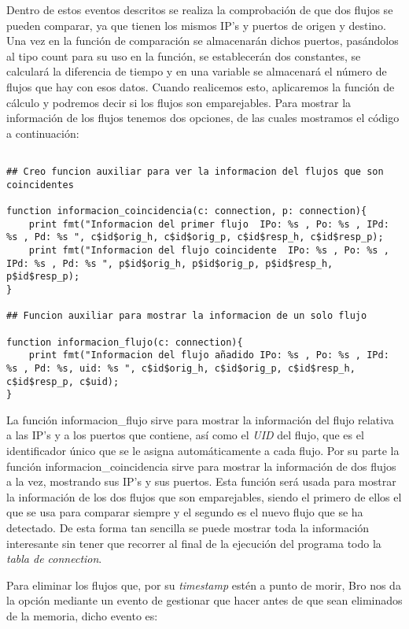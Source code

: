 Dentro de estos eventos descritos se realiza la comprobación de que dos 
flujos se pueden comparar, ya que tienen los mismos IP’s y puertos de 
origen y destino. Una vez en la función de comparación se almacenarán 
dichos puertos, pasándolos al tipo count para su uso en la función, se 
establecerán dos constantes, se calculará la diferencia de tiempo y en 
una variable se almacenará el número de flujos que hay con esos datos. 
Cuando realicemos esto, aplicaremos la función de cálculo y podremos 
decir si los flujos son emparejables.
\intro
Para mostrar la información de los flujos tenemos dos opciones, de las 
cuales mostramos el código a continuación:
\intro
\begin{lstlisting}[style=CodigoC]

## Creo funcion auxiliar para ver la informacion del flujos que son coincidentes

function informacion_coincidencia(c: connection, p: connection){
    print fmt("Informacion del primer flujo  IPo: %s , Po: %s , IPd: %s , Pd: %s ", c$id$orig_h, c$id$orig_p, c$id$resp_h, c$id$resp_p);
    print fmt("Informacion del flujo coincidente  IPo: %s , Po: %s , IPd: %s , Pd: %s ", p$id$orig_h, p$id$orig_p, p$id$resp_h, p$id$resp_p);
}

## Funcion auxiliar para mostrar la informacion de un solo flujo

function informacion_flujo(c: connection){
    print fmt("Informacion del flujo añadido IPo: %s , Po: %s , IPd: %s , Pd: %s, uid: %s ", c$id$orig_h, c$id$orig_p, c$id$resp_h, c$id$resp_p, c$uid);
}

\end{lstlisting}

La función informacion\_flujo sirve para mostrar la información del flujo 
relativa a las IP’s y a los puertos que contiene, así como el \textit{UID} 
del flujo, que es el identificador único que se le asigna automáticamente 
a cada flujo. 
\intro
Por su parte la función informacion\_coincidencia sirve para mostrar la 
información de dos flujos a la vez, mostrando sus IP’s y sus puertos. 
Esta función será usada para mostrar la información de los dos flujos que 
son emparejables, siendo el primero de ellos el que se usa para comparar siempre 
y el segundo es el nuevo flujo que se ha detectado. De esta forma tan sencilla 
se puede mostrar toda la información interesante sin tener que recorrer al final de 
la ejecución del programa todo la \textit{tabla de connection}.

\intro
Para eliminar los flujos que, por su \textit{timestamp} estén a punto de morir, Bro nos 
da la opción mediante un evento de gestionar que hacer antes de que sean eliminados 
de la memoria, dicho evento es: 

